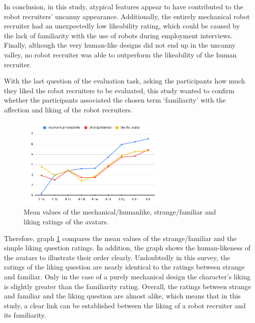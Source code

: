In conclusion, in this study, atypical features appear to have contributed to the robot recruiters' uncanny appearance. Additionally, the entirely mechanical robot recruiter had an unexpectedly low likeability rating, which could be caused by the lack of familiarity with the use of robots during employment interviews. Finally, although the very human-like designs did not end up in the uncanny valley, no robot recruiter was able to outperform the likeability of the human recruiter.\par
With the last question of the evaluation task, asking the participants how much they liked the robot recruiters to be evaluated, this study wanted to confirm whether the participants associated the chosen term `familiarity' with the affection and liking of the robot recruiters. 
\begin{figure} %
    \centering
    \includegraphics[width=0.65\textwidth]{graphics/result/result4.png}
    \caption{Mean values of the mechanical/humanlike, strange/familiar and liking ratings of the avatars.}
    \label{fig:likeability}
\end{figure}
Therefore, graph \ref{fig:likeability} compares the mean values of the strange/familiar and the simple liking question ratings. In addition, the graph shows the human-likeness of the avatars to illustrate their order clearly. Undoubtedly in this survey, the ratings of the liking question are nearly identical to the ratings between strange and familiar. Only in the case of a purely mechanical design the character's liking is slightly greater than the familiarity rating. Overall, the ratings between strange and familiar and the liking question are almost alike, which means that in this study, a clear link can be established between the liking of a robot recruiter and its familiarity.\\
